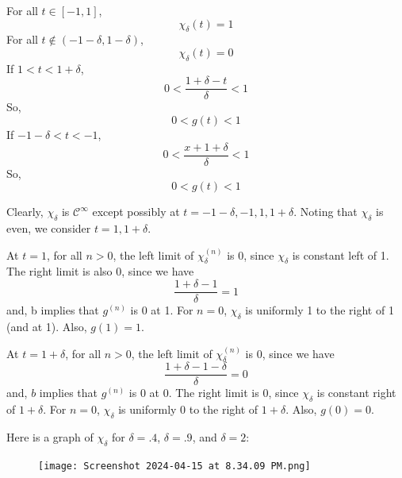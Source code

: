 \documentclass[12pt, reqno]{amsart}
\theoremstyle{definition}
\theoremstyle{remark}
\begin{document}
\begin{itemize}
\begin{itemize}
For all $t\in[-1,1]$, $$\chi_{\delta}(t)=1$$
For all $t\notin(-1-\delta,1-\delta)$, $$\chi_{\delta}(t)=0$$
If $1<t<1+\delta$, $$0<\frac{1+\delta-t}{\delta}<1$$
So, $$0<g(t)<1$$
If $-1-\delta<t<-1$, $$0< \frac{x+1+\delta}{\delta}<1$$So, $$0<g(t)<1$$


\vspace*{10 pt}

Clearly, $\chi_{\delta}$ is $\mathcal{C}^{\infty}$ except possibly at $t=-1-\delta,-1,1,1+\delta$. Noting that $\chi_{\delta}$ is even, we consider $t=1,1+\delta$. 

At $t=1$, for all $n>0$, the left limit of $\chi_{\delta}^{(n)}$ is $0$, since $\chi_{\delta}$ is constant left of 1. The right limit is also 0, since we have $$\frac{1+\delta-1}{\delta}=1$$and, b implies that $g^{(n)}$ is 0 at 1. For $n=0$, $\chi_{\delta}$ is uniformly 1 to the right of 1 (and at 1). Also, $g(1)=1$.

At $t=1+\delta$, for all $n>0$, the left limit of $\chi_{\delta}^{(n)}$ is 0, since we have $$\frac{1+\delta-1-\delta}{\delta}=0$$and, $b$ implies that $g^{(n)}$ is 0 at $0$. The right limit is 0, since $\chi_{\delta}$ is constant right of $1+\delta$. For $n=0$, $\chi_{\delta}$ is uniformly 0 to the right of $1+\delta$. Also, $g(0)=0$.

Here is a graph of $\chi_\delta$ for $\delta=.4$, $\delta=.9$, and $\delta=2$: 

\begin{figure}[h]
    
    \texttt{[image: Screenshot 2024-04-15 at 8.34.09 PM.png]}

\end{figure}





\end{itemize}


\end{itemize}
\end{document}
